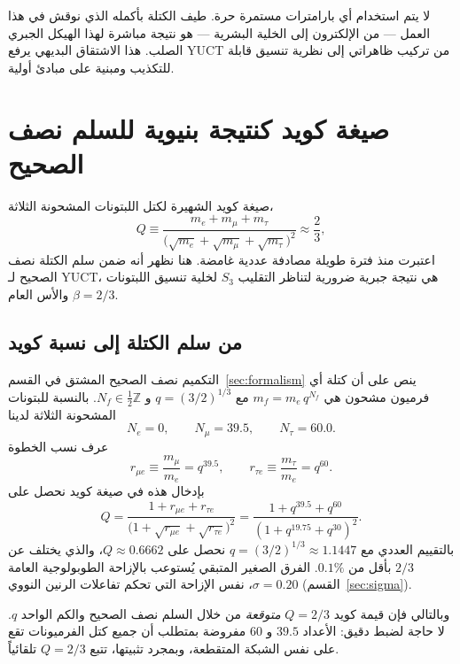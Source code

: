 \documentclass[11pt,a4paper]{article}
\begin{document}
	لا يتم استخدام أي بارامترات مستمرة حرة. طيف الكتلة بأكمله الذي نوقش في هذا العمل — من الإلكترون إلى الخلية البشرية — هو نتيجة مباشرة لهذا الهيكل الجبري الصلب. هذا الاشتقاق البديهي يرفع YUCT من تركيب ظاهراتي إلى نظرية تنسيق قابلة للتكذيب ومبنية على مبادئ أولية.
	
	\section{صيغة كويد كنتيجة بنيوية للسلم نصف الصحيح}
	\label{sec:koide}
	
	صيغة كويد الشهيرة \cite{Koide1983} لكتل اللبتونات المشحونة الثلاثة،
	\begin{equation}
		Q \equiv \frac{m_e + m_\mu + m_\tau}{\bigl(\sqrt{m_e} + \sqrt{m_\mu} + \sqrt{m_\tau}\bigr)^2}
		\approx \frac{2}{3},
	\end{equation}
	اعتبرت منذ فترة طويلة مصادفة عددية غامضة. هنا نظهر أنه ضمن سلم الكتلة نصف الصحيح لـ YUCT، هي نتيجة جبرية ضرورية لتناظر التقليب \(S_3\) لخلية تنسيق اللبتونات والأس العام \(\beta = 2/3\).
	
	\subsection{من سلم الكتلة إلى نسبة كويد}
	
	التكميم نصف الصحيح المشتق في القسم~\ref{sec:formalism} ينص على أن كتلة أي فرميون مشحون هي \(m_f = m_e \, q^{N_f}\) مع \(q = (3/2)^{1/3}\) و \(N_f \in \frac12\mathbb{Z}\). بالنسبة للبتونات المشحونة الثلاثة لدينا
	\[
	N_e = 0,\qquad N_\mu = 39.5,\qquad N_\tau = 60.0 .
	\]
	عرف نسب الخطوة
	\[
	r_{\mu e} \equiv \frac{m_\mu}{m_e} = q^{39.5},\qquad
	r_{\tau e} \equiv \frac{m_\tau}{m_e} = q^{60}.
	\]
	بإدخال هذه في صيغة كويد نحصل على
	\begin{equation}
		Q = \frac{1 + r_{\mu e} + r_{\tau e}}{\bigl(1 + \sqrt{r_{\mu e}} + \sqrt{r_{\tau e}}\bigr)^2}
		= \frac{1 + q^{39.5} + q^{60}}{(1 + q^{19.75} + q^{30})^2}.
		\label{eq:Q_ladder}
	\end{equation}
	بالتقييم العددي مع \(q = (3/2)^{1/3} \approx 1.1447\) نحصل على \(Q \approx 0.6662\)، والذي يختلف عن \(2/3\) بأقل من \(0.1\%\). الفرق الصغير المتبقي يُستوعب بالإزاحة الطوبولوجية العامة \(\sigma = 0.20\)، نفس الإزاحة التي تحكم تفاعلات الرنين النووي (القسم~\ref{sec:sigma}).
	
	وبالتالي فإن قيمة كويد \(Q = 2/3\) \emph{متوقعة} من خلال السلم نصف الصحيح والكم الواحد \(q\). لا حاجة لضبط دقيق: الأعداد \(39.5\) و \(60\) مفروضة بمتطلب أن جميع كتل الفرميونات تقع على نفس الشبكة المتقطعة، وبمجرد تثبيتها، تتبع \(Q = 2/3\) تلقائياً.
	
\end{document}
